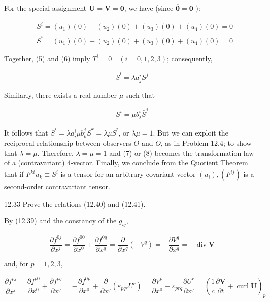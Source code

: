\documentclass[10pt]{article}
\begin{document}
For the special assignment $\mathbf{U}=\mathbf{V}=\mathbf{0}$, we have (since $\overline{\mathbf{0}}=\mathbf{0}$ ):


\begin{align*}
& S^{i}=\left(u_{1}\right)(0)+\left(u_{2}\right)(0)+\left(u_{3}\right)(0)+\left(u_{4}\right)(0)=0  \tag{6}\\
& \bar{S}^{i}=\left(\bar{u}_{1}\right)(0)+\left(\bar{u}_{2}\right)(0)+\left(\bar{u}_{3}\right)(0)+\left(\bar{u}_{4}\right)(0)=0
\end{align*}


Together, (5) and (6) imply $T^{i}=0 \quad(i=0,1,2,3)$; consequently,


\begin{equation*}
\bar{S}^{i}=\lambda a_{j}^{i} S^{j} \tag{7}
\end{equation*}


Similarly, there exists a real number $\mu$ such that


\begin{equation*}
S^{i}=\mu b_{j}^{i} \bar{S}^{j} \tag{8}
\end{equation*}


It follows that $\bar{S}^{i}=\lambda a_{i}^{i} \mu b_{k}^{j} \bar{S}^{k}=\lambda \mu \bar{S}^{i}$, or $\lambda \mu=1$. But we can exploit the reciprocal relationship between observers $O$ and $\bar{O}$, as in Problem 12.4; to show that $\lambda=\mu$. Therefore, $\lambda=\mu=1$ and (7) or (8) becomes the transformation law of a (contravariant) 4-vector. Finally, we conclude from the Quotient Theorem that if $F^{k i} u_{k} \equiv S^{i}$ is a tensor for an arbitrary covariant vector $\left(u_{i}\right),\left(F^{i j}\right)$ is a second-order contravariant tensor.

12.33 Prove the relations (12.40) and (12.41).

By (12.39) and the constancy of the $g_{i j}$,

$$
\frac{\partial f^{0 j}}{\partial x^{j}}=\frac{\partial f^{00}}{\partial x^{0}}+\frac{\partial f^{0 q}}{\partial x^{q}}=\frac{\partial}{\partial x^{q}}\left(-V^{q}\right)=-\frac{\partial V^{q}}{\partial x^{q}}=-\operatorname{div} \mathbf{V}
$$

and, for $p=1,2,3$,

$$
\frac{\partial f^{p j}}{\partial x^{j}}=\frac{\partial f^{p 0}}{\partial x^{0}}+\frac{\partial f^{p q}}{\partial x^{q}}=-\frac{\partial f^{0 p}}{\partial x^{0}}+\frac{\partial}{\partial x^{q}}\left(\varepsilon_{p q r} U^{r}\right)=\frac{\partial V^{p}}{\partial x^{0}}-\varepsilon_{p r q} \frac{\partial U^{r}}{\partial x^{q}}=\left(\frac{1}{c} \frac{\partial \mathbf{V}}{\partial t}+\operatorname{curl} \mathbf{U}\right)_{p}
$$
\end{document}
